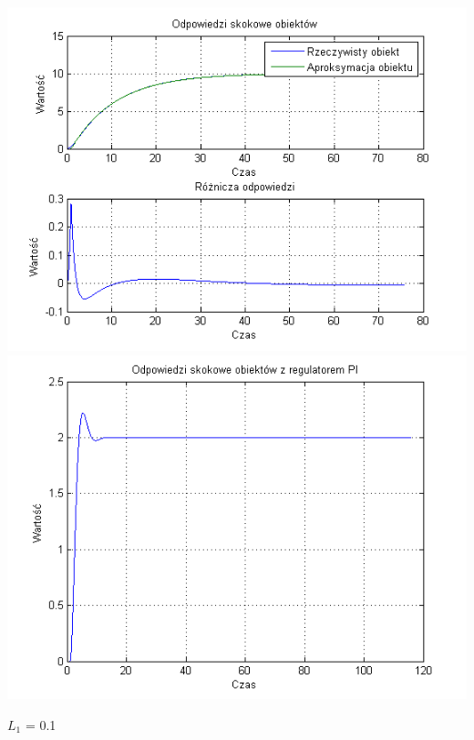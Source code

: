 \documentclass[10pt,a4paper]{article}
\begin{document}
\begin{center}
\includegraphics[scale=1]{images/jeden/skrypt_211.png}\\
\includegraphics[scale=1]{images/jeden/skrypt_212.png}\\
\end{center}
\newpage
$L_1$ = 0.1
\end{document}
